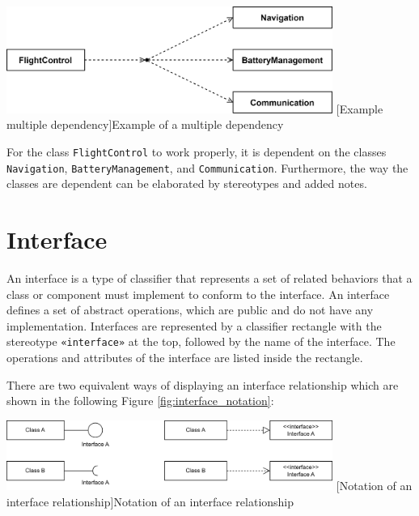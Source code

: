 \documentclass[
	12pt,
    a4paper,
    egregdoesnotlikesansseriftitles, %
    toc=chapterentrywithdots,
    oneside, openany,
    titlepage,
    parskip=half,
    headings=normal,  %
    listof=totoc,
    bibliography=totocnumbered,
    index=totoc,
    captions=tableheading,  %
    listof=flat,
    numbers=noenddot, %
    final]
    {scrbook}
\begin{document}
\vspace{1em}
\begin{minipage}{\linewidth}
	\centering
	\includegraphics[width=0.8\textwidth]{figures/dependencies/multiple_dependencies.jpg}
	[Example multiple dependency]{Example of a multiple dependency}
	\label{fig:multiple_dependencies_example}
\end{minipage}
\vspace{1em}


For the class \texttt{FlightControl} to work properly, it is dependent on the classes \texttt{Navigation}, \texttt{BatteryManagement}, and \texttt{Communication}.
Furthermore, the way the classes are dependent can be elaborated by stereotypes and added notes.

\section{Interface}

An interface is a type of classifier that represents a set of related behaviors that a class or component must implement to conform to the interface. 
An interface defines a set of abstract operations, which are public and do not have any implementation.
Interfaces are represented by a classifier rectangle with the stereotype \texttt{«interface»} at the top, followed by the name of the interface. 
The operations and attributes of the interface are listed inside the rectangle. \cite[p. 130-131]{uml}

There are two equivalent ways of displaying an interface relationship which are shown in the following Figure \ref{fig:interface_notation}:

\vspace{1em}
\begin{minipage}{\linewidth}
	\centering
	\includegraphics[width=0.8\textwidth]{figures/interface/Interface_Notation.jpg}
	[Notation of an interface relationship]{Notation of an interface relationship}
	\label{fig:interface_notation}
\end{minipage}
\vspace{1em}
\end{document}
